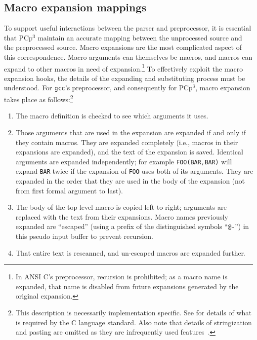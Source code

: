 \documentclass{article}
\newcommand{\pcp}{\mbox{\textsf{PCp}$^3$}}
\newcommand{\C}{\mbox{\textsf{C}}}
\newcommand{\ie}{i.e.,}
\begin{document}
\subsection{Macro expansion mappings}
To support useful interactions between the parser and preprocessor, it
is essential that \pcp{} maintain an accurate mapping between the
unprocessed source and the preprocessed source.  Macro expansions are
the most complicated aspect of this correspondence.  Macro arguments can
themselves be macros, and macros can expand to other macros in need of
expansion.\footnote{In ANSI \C{}'s preprocessor, recursion is
  prohibited; as a macro name is expanded, that name is disabled from
  future expansions generated by the original expansion.}  To
effectively exploit the macro expansion hooks, the details of the
expanding and substituting process must be understood.  For
\texttt{gcc}'s preprocessor, and consequently for \pcp{}, macro
expansion takes place as follows:\footnote{This description is necessarily
  implementation specific.  See \cite[Ch.~3]{Harbison91} for details of
  what is required by the \C{} language standard.  Also note that
  details of stringization and pasting are omitted as they are
  infrequently used features~\cite{EmpCpp}.}

\begin{enumerate}
\item The macro definition is checked to see which arguments it uses.
\item Those arguments that are used in the expansion are expanded if and
      only if they contain macros.  They are expanded completely (\ie{}
      macros in their expansions are expanded), and the text of the
      expansion is saved.  Identical arguments are expanded
      independently; for example \texttt{FOO(BAR,BAR)} will expand
      \texttt{BAR} twice if the expansion of \texttt{FOO} uses both of
      its arguments.  They are expanded in the order that they are used
      in the body of the expansion (not from first formal argument to
      last).
\item The body of the top level macro is copied left to right; arguments
      are replaced with the text from their expansions.  Macro names
      previously expanded are ``escaped'' (using a prefix of the
      distinguished symbols ``\texttt{@-}'') in this pseudo input buffer
      to prevent recursion.
\item That entire text is rescanned, and un-escaped macros are expanded
      further.
\end{enumerate}
\end{document}
